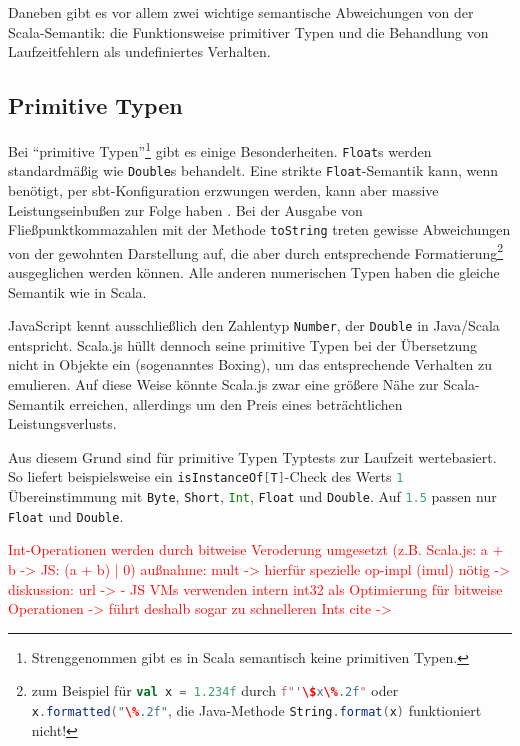 \documentclass[a4paper, 12pt, hidelinks, listof=totoc, listoftables=totoc, bibliography=totoc]{scrreprt}
\newcommand{\scala}[1]{\lstinline[language=Scala, style=inline]|#1|}
\newcommand{\TODO}[1]{\textcolor{red}{#1}\newline}
\begin{document}
Daneben gibt es vor allem zwei wichtige semantische Abweichungen von der Scala-Semantik: die Funktionsweise primitiver Typen und die Behandlung von Laufzeitfehlern als undefiniertes Verhalten.


\subsection{Primitive Typen}

Bei "`primitive Typen"'\footnote{Strenggenommen gibt es in Scala semantisch keine primitiven Typen.} gibt es einige Besonderheiten. \scala{Float}s werden standardmäßig wie \scala{Double}s behandelt. Eine strikte \scala{Float}-Semantik kann, wenn benötigt, per sbt-Konfiguration erzwungen werden, kann aber massive Leistungseinbußen zur Folge haben \cite[S.~2]{doeraene2013.TDI}\cite{scalajs.DSS}. 
Bei der Ausgabe von Fließpunktkommazahlen mit der Methode \scala{toString} treten gewisse Abweichungen von der gewohnten Darstellung auf, die aber durch entsprechende Formatierung\footnote{zum Beispiel für \scala{val x = 1.234f} durch \scala{f"'\$x\%.2f"} oder \scala{x.formatted("\%.2f"}, die Java-Methode \scala{String.format(x)} funktioniert nicht!} ausgeglichen werden können. Alle anderen numerischen Typen haben die gleiche Semantik wie in Scala. 

JavaScript kennt ausschließlich den Zahlentyp \scala{Number}, der \scala{Double} in Java/Scala entspricht. Scala.js hüllt dennoch seine primitive Typen bei der Übersetzung nicht in Objekte ein (sogenanntes Boxing), um das entsprechende Verhalten zu emulieren. Auf diese Weise könnte Scala.js zwar eine größere Nähe zur Scala-Semantik erreichen, allerdings um den Preis eines beträchtlichen Leistungsverlusts. \cite[S. 2]{doeraene2013.TDI}\cite[\#ThePerformance/CorrectnessTradeoff]{haoyi.HOS}

Aus diesem Grund sind für primitive Typen Typtests zur Laufzeit wertebasiert. So liefert beispielsweise ein \scala{isInstanceOf[T]}-Check des Werts \scala{1} Übereinstimmung mit \scala{Byte}, \scala{Short}, \scala{Int}, \scala{Float} und \scala{Double}. Auf \scala{1.5} passen nur \scala{Float} und \scala{Double}.\cite{scalajs.DSS}

\TODO{Int-Operationen werden durch bitweise Veroderung umgesetzt (z.B. Scala.js: a + b -> JS: (a + b) | 0)}
\TODO{außnahme: mult -> hierfür spezielle op-impl (imul) nötig  -> diskussion: url -> %
}
\TODO{- JS VMs verwenden intern int32 als Optimierung für bitweise Operationen}
\TODO{-> führt deshalb sogar zu schnelleren Ints}
\TODO{cite -> %
}
\end{document}
